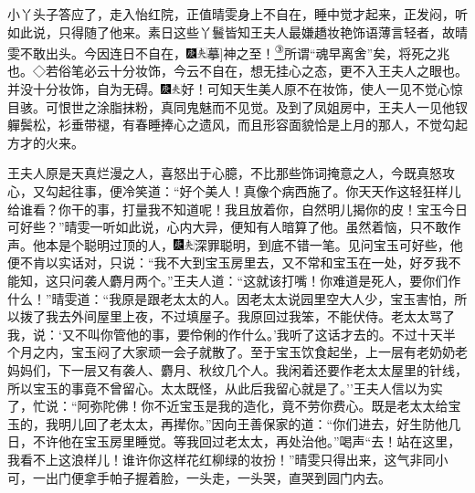 小丫头子答应了，走入怡红院，正值晴雯身上不自在，睡中觉才起来，正发闷，听如此说，只得随了他来。素日这些丫鬟皆知王夫人最嫌趫妆艳饰语薄言轻者，故晴雯不敢出头。今因连日不自在，{\includegraphics[width=3mm]{../Images/00004}\includegraphics[width=3mm]{../Images/00012}\footnotesize \kaishu {(音)}{[}摹{]}神之至！}\href{../Text/part0078_split_000.html\#lnkback_3_a}{\textsuperscript{③}}{所谓``魂早离舍''矣，将死之兆也。◇若俗笔必云十分妆饰，今云不自在，想无挂心之态，更不入王夫人之眼也。}并没十分妆饰，自为无碍。{\includegraphics[width=3mm]{../Images/00004}\includegraphics[width=3mm]{../Images/00012}\footnotesize \kaishu 好！可知天生美人原不在妆饰，使人一见不觉心惊目骇。可恨世之涂脂抹粉，真同鬼魅而不见觉。}及到了凤姐房中，王夫人一见他钗軃鬓松，衫垂带褪，有春睡捧心之遗风，而且形容面貌恰是上月的那人，不觉勾起方才的火来。

王夫人原是天真烂漫之人，喜怒出于心臆，不比那些饰词掩意之人，今既真怒攻心，又勾起往事，便冷笑道：``好个美人！真像个病西施了。你天天作这轻狂样儿给谁看？你干的事，打量我不知道呢！我且放着你，自然明儿揭你的皮！宝玉今日可好些？''晴雯一听如此说，心内大异，便知有人暗算了他。虽然着恼，只不敢作声。他本是个聪明过顶的人，{\includegraphics[width=3mm]{../Images/00004}\includegraphics[width=3mm]{../Images/00012}\footnotesize \kaishu 深罪聪明，到底不错一笔。}见问宝玉可好些，他便不肯以实话对，只说：``我不大到宝玉房里去，又不常和宝玉在一处，好歹我不能知，这只问袭人麝月两个。''王夫人道：``这就该打嘴！你难道是死人，要你们作什么！''晴雯道：``我原是跟老太太的人。因老太太说园里空大人少，宝玉害怕，所以拨了我去外间屋里上夜，不过填屋子。我原回过我笨，不能伏侍。老太太骂了我，说：`又不叫你管他的事，要伶俐的作什么。'我听了这话才去的。不过十天半个月之内，宝玉闷了大家顽一会子就散了。至于宝玉饮食起坐，上一层有老奶奶老妈妈们，下一层又有袭人、麝月、秋纹几个人。我闲着还要作老太太屋里的针线，所以宝玉的事竟不曾留心。太太既怪，从此后我留心就是了。''王夫人信以为实了，忙说：``阿弥陀佛！你不近宝玉是我的造化，竟不劳你费心。既是老太太给宝玉的，我明儿回了老太太，再撵你。''因向王善保家的道：``你们进去，好生防他几日，不许他在宝玉房里睡觉。等我回过老太太，再处治他。''喝声``去！站在这里，我看不上这浪样儿！谁许你这样花红柳绿的妆扮！''晴雯只得出来，这气非同小可，一出门便拿手帕子握着脸，一头走，一头哭，直哭到园门内去。

